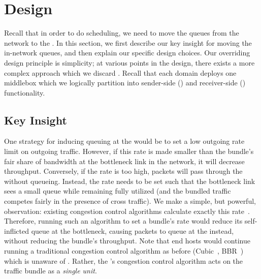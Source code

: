 \section{Design}\label{s:design}
%

Recall that in order to do scheduling, we need to move the queues from the network to the \name. 
In this section, we first describe our key insight for moving the in-network queues, and then explain our specific design choices. 
Our overriding design principle is simplicity; at various points in the design, there exists a more complex approach which we discard .
Recall that each domain deploys one \name middlebox which we logically partition into sender-side (\inbox) and receiver-side (\outbox) functionality.

\subsection{Key Insight}
One strategy for inducing queuing at the \inbox would be to set a low outgoing rate limit on outgoing traffic. 
However, if this rate is made smaller than the bundle's fair share of bandwidth at the bottleneck link in the network, it will decrease throughput. 
Conversely, if the rate is too high, packets will pass through the \inbox without queueing.
Instead, the rate needs to be set such that the bottleneck link sees a small queue while remaining fully utilized (and the bundled traffic competes fairly in the presence of cross traffic). 
We make a simple, but powerful, observation: existing congestion control algorithms calculate exactly this rate~\cite{Jacobson88}. 
Therefore, running such an algorithm to set a bundle's rate would reduce its self-inflicted queue at the bottleneck, causing packets to queue at the \inbox instead, without reducing the bundle's throughput.
Note that end hosts would continue running a traditional congestion control algorithm as before (\eg Cubic~\cite{cubic}, BBR~\cite{bbr}) which is unaware of \name.
Rather, the \inbox's congestion control algorithm acts on the traffic bundle as a \emph{single unit}.

